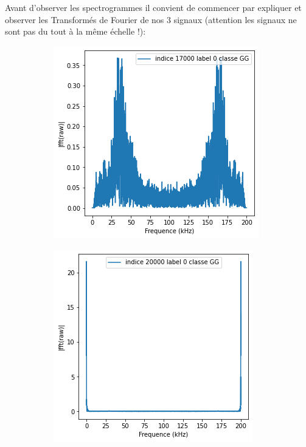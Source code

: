 Avant d'observer les spectrogrammes il convient de commencer par expliquer et observer les Transformés de Fourier de nos 3 signaux (attention les signaux ne sont pas du tout à la même échelle !):
\begin{figure}[!h]
\centering
  \begin{subfigure}[b]{0.3\textwidth}
    \includegraphics[width=\textwidth]{./images/17000fft.png}
  \end{subfigure}
  \begin{subfigure}[b]{0.3\textwidth}
    \includegraphics[width=\textwidth]{./images/20000fft.png}

\end{subfigure}
\end{figure}
